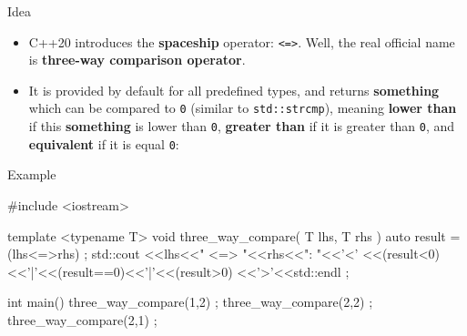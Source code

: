 \begin{frame}[fragile]
  \begin{block}{Idea}
    \begin{itemize}
    \item C++20 introduces the \textbf{spaceship} operator: \texttt{<=>}. Well, the real official name is \textbf{three-way comparison operator}.
    \item It is provided by default for all predefined types, and returns \textbf{something} which can be compared to \texttt{0} (similar to \texttt{std::strcmp}), meaning \textbf{lower than} if this \textbf{something} is lower than \texttt{0}, \textbf{greater than} if it is greater than \texttt{0}, and \textbf{equivalent} if it is equal \texttt{0}:
    \end{itemize}
  \end{block}
  \begin{exampleblock}{Example}
    \begin{cppcode*}{}
    #include <iostream>

    template <typename T>
    void three_way_compare( T lhs, T rhs )
     {
      auto result = (lhs<=>rhs) ;
      std::cout
        <<lhs<<" <=> "<<rhs<<": "<<'<'
        <<(result<0)<<'|'<<(result==0)<<'|'<<(result>0)
        <<'>'<<std::endl ;
     }

    int main()
     {
      three_way_compare(1,2) ;
      three_way_compare(2,2) ;
      three_way_compare(2,1) ;
     }
    \end{cppcode*}
  \end{exampleblock}
\end{frame}

